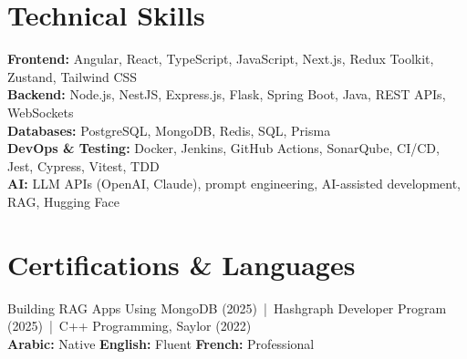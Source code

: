 \documentclass[10pt,a4paper]{article}
\begin{document}
\section*{Technical Skills}
{\small
\textbf{Frontend:} Angular, React, TypeScript, JavaScript, Next.js, Redux Toolkit, Zustand, Tailwind CSS\\
\textbf{Backend:} Node.js, NestJS, Express.js, Flask, Spring Boot, Java, REST APIs, WebSockets\\
\textbf{Databases:} PostgreSQL, MongoDB, Redis, SQL, Prisma\\
\textbf{DevOps \& Testing:} Docker, Jenkins, GitHub Actions, SonarQube, CI/CD, Jest, Cypress, Vitest, TDD\\
\textbf{AI:} LLM APIs (OpenAI, Claude), prompt engineering, AI-assisted development, RAG, Hugging Face
}

\section*{Certifications \& Languages}
{\small
Building RAG Apps Using MongoDB (2025) \,|\, Hashgraph Developer Program (2025) \,|\, C++ Programming, Saylor (2022)\\[2pt]
\textbf{Arabic:} Native \quad \textbf{English:} Fluent \quad \textbf{French:} Professional
}
\end{document}
